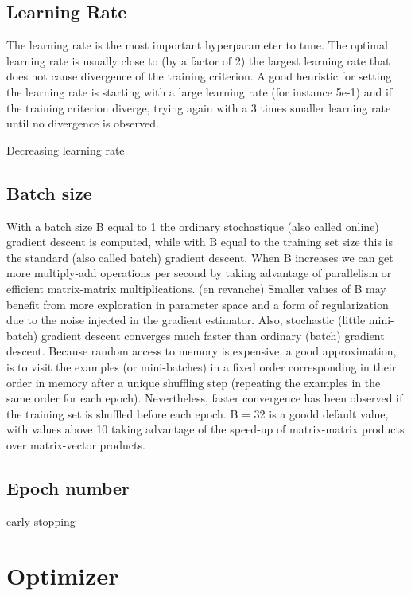 \subsection{Learning Rate}

The learning rate is the most important hyperparameter to tune. The optimal learning rate is usually close to (by a factor of 2) the largest learning rate that does not cause divergence of the training criterion. A good heuristic for setting the learning rate is starting with a large learning rate (for instance 5e-1) and if the training criterion diverge, trying again with a 3 times smaller learning rate until no divergence is observed.

Decreasing learning rate

\subsection{Batch size}

With a batch size B equal to 1 the ordinary stochastique (also called online) gradient descent is computed, while with B equal to the training set size this is the standard (also called batch) gradient descent. When B increases we can get more multiply-add operations per second by taking advantage of parallelism or efficient matrix-matrix multiplications. (en revanche) Smaller values of B may benefit from more exploration in parameter space and a form of regularization due to the noise injected in the gradient estimator. Also, stochastic (little mini-batch) gradient descent converges much faster than ordinary (batch) gradient descent. 
Because random access to memory is expensive, a good approximation, is to visit the examples (or mini-batches) in a fixed order corresponding in their order in memory after a unique shuffling step (repeating the examples in the same order for each epoch). Nevertheless, faster convergence has been observed if the training set is shuffled before each epoch.
B = 32 is a goodd default value, with values above 10 taking advantage of the speed-up of matrix-matrix products over matrix-vector products.

\subsection{Epoch number}

early stopping




\section{Optimizer}

